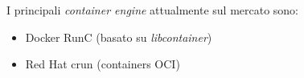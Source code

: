 \documentclass[../main.tex]{subfiles}
\begin{document}
            I principali \emph{container engine}\cite{cloud_container_runtime} attualmente sul mercato sono:
            \begin{itemize}
                \item Docker RunC (basato su \emph{libcontainer})
                \item Red Hat crun (containers OCI)
            \end{itemize}
\end{document}
